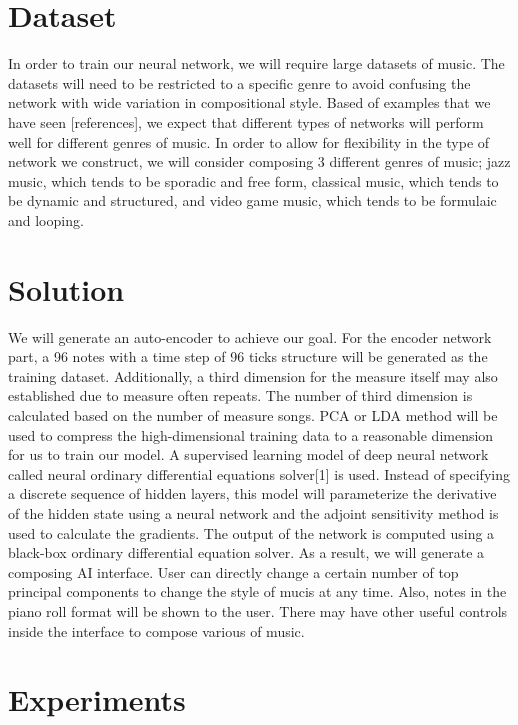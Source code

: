 \documentclass[conference]{IEEEtran}
\begin{document}
\section{Dataset}
In order to train our neural network, we will require large datasets of music. The datasets will need to be restricted to a specific genre to avoid confusing the network with wide variation in compositional style. Based of examples that we have seen [references], we expect that different types of networks will perform well for different genres of music. In order to allow for flexibility in the type of network we construct, we will consider composing 3 different genres of music; jazz music, which tends to be sporadic and free form, classical music, which tends to be dynamic and structured, and video game music, which tends to be formulaic and looping.


\section{Solution}
We will generate an auto-encoder to achieve our goal. For the encoder network part, a 96 notes with a time step of 96 ticks structure will be generated as the training dataset. Additionally, a third dimension for the measure itself may also established due to measure often repeats. The number of third dimension is calculated based on the number of measure songs. PCA or LDA method will be used to compress the high-dimensional training data to a reasonable dimension for us to train our model. A supervised learning model of deep neural network called neural ordinary differential equations solver[1] is used. Instead of specifying a discrete sequence of hidden layers, this model will parameterize the derivative of the hidden state using a neural network and the adjoint sensitivity method is used to calculate the gradients.  The output of the network is computed using a black-box ordinary differential equation solver. As a result, we will generate a composing AI interface. User can directly change a certain number of top principal components to change the style of mucis at any time. Also, notes in the piano roll format will be shown to the user. There may have other useful controls inside the interface to compose various of music.

\section{Experiments}




\end{document}
